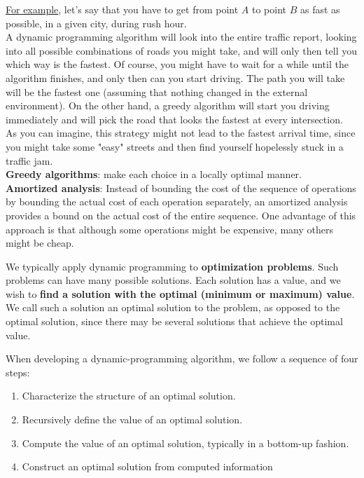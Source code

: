 \documentclass{article}
\begin{document}
\underline{For example}, let's say that you have to get from point $A$ to point $B$ as fast as possible, in a given city, during rush hour. \\
A dynamic programming algorithm will look into the entire traffic report, looking into all possible combinations of roads you might take, and will only then tell you which way is the fastest. Of course, you might have to wait for a while until the algorithm finishes, and only then can you start driving. The path you will take will be the fastest one (assuming that nothing changed in the external environment). On the other hand, a greedy algorithm will start you driving immediately and will pick the road that looks the fastest at every intersection. \\
As you can imagine, this strategy might not lead to the fastest arrival time, since you might take some "easy" streets and then find yourself hopelessly stuck in a traffic jam.\\

\noindent
\textbf{Greedy algorithms}: make each choice in a locally optimal manner.\\
\textbf{Amortized analysis}: Instead of bounding the cost of the sequence of operations by bounding the actual cost of each operation separately, an amortized analysis provides a bound on the actual cost of the entire sequence. One advantage of this approach is that although some operations might be expensive, many others might be cheap.

We typically apply dynamic programming to \textbf{optimization problems}. Such problems can have many possible solutions. Each solution has a value, and we wish to \textbf{find a solution with the optimal (minimum or maximum) value}. We call such a solution an optimal solution to the problem, as opposed to the optimal solution, since there may be several solutions that achieve the optimal value.

When developing a dynamic-programming algorithm, we follow a sequence of four steps:
\begin{enumerate}
\item Characterize the structure of an optimal solution.
\item Recursively define the value of an optimal solution.
\item Compute the value of an optimal solution, typically in a bottom-up fashion.
\item Construct an optimal solution from computed information
\end{enumerate}
\end{document}
